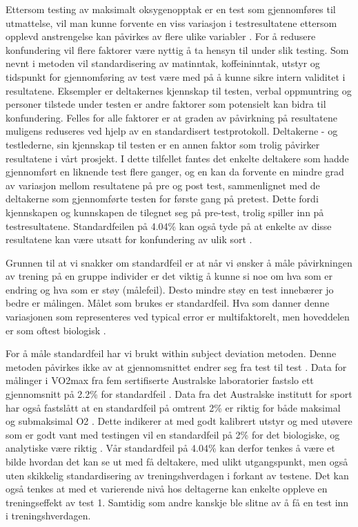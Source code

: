\documentclass[
]{book}
\begin{document}
Ettersom testing av maksimalt oksygenopptak er en test som gjennomføres til utmattelse, vil man kunne forvente en viss variasjon i testresultatene ettersom opplevd anstrengelse kan påvirkes av flere ulike variabler \citep{halperin2015}. For å redusere konfundering vil flere faktorer være nyttig å ta hensyn til under slik testing. Som nevnt i metoden vil standardisering av matinntak, koffeininntak, utstyr og tidspunkt for gjennomføring av test være med på å kunne sikre intern validitet i resultatene. Eksempler er deltakernes kjennskap til testen, verbal oppmuntring og personer tilstede under testen er andre faktorer som potensielt kan bidra til konfundering. Felles for alle faktorer er at graden av påvirkning på resultatene muligens reduseres ved hjelp av en standardisert testprotokoll. Deltakerne - og testlederne, sin kjennskap til testen er en annen faktor som trolig påvirker resultatene i vårt prosjekt. I dette tilfellet fantes det enkelte deltakere som hadde gjennomført en liknende test flere ganger, og en kan da forvente en mindre grad av variasjon mellom resultatene på pre og post test, sammenlignet med de deltakerne som gjennomførte testen for første gang på pretest. Dette fordi kjennskapen og kunnskapen de tilegnet seg på pre-test, trolig spiller inn på testresultatene. Standardfeilen på 4.04\% kan også tyde på at enkelte av disse resultatene kan være utsatt for konfundering av ulik sort \citep{hopkins2000}.

Grunnen til at vi snakker om standardfeil er at når vi ønsker å måle påvirkningen av trening på en gruppe individer er det viktig å kunne si noe om hva som er endring og hva som er støy (målefeil). Desto mindre støy en test innebærer jo bedre er målingen. Målet som brukes er standardfeil. Hva som danner denne variasjonen som representeres ved typical error er multifaktorelt, men hoveddelen er som oftest biologisk \citep{hopkins2000}.

For å måle standardfeil har vi brukt within subject deviation metoden. Denne metoden påvirkes ikke av at gjennomsnittet endrer seg fra test til test \citep{hopkins2000}. Data for målinger i VO2max fra fem sertifiserte Australske laboratorier fastslo ett gjennomsnitt på 2.2\% for standardfeil \citep{halperin2015}. Data fra det Australske institutt for sport har også fastslått at en standardfeil på omtrent 2\% er riktig for både maksimal og submaksimal O2 \citep{clark2007, robertson2010, saunders2009}. Dette indikerer at med godt kalibrert utstyr og med utøvere som er godt vant med testingen vil en standardfeil på 2\% for det biologiske, og analytiske være riktig \citep{halperin2015}. Vår standardfeil på 4.04\% kan derfor tenkes å være et bilde hvordan det kan se ut med få deltakere, med ulikt utgangspunkt, men også uten skikkelig standardisering av treningshverdagen i forkant av testene. Det kan også tenkes at med et varierende nivå hos deltagerne kan enkelte oppleve en treningseffekt av test 1. Samtidig som andre kanskje ble slitne av å få en test inn i treningshverdagen.
\end{document}
